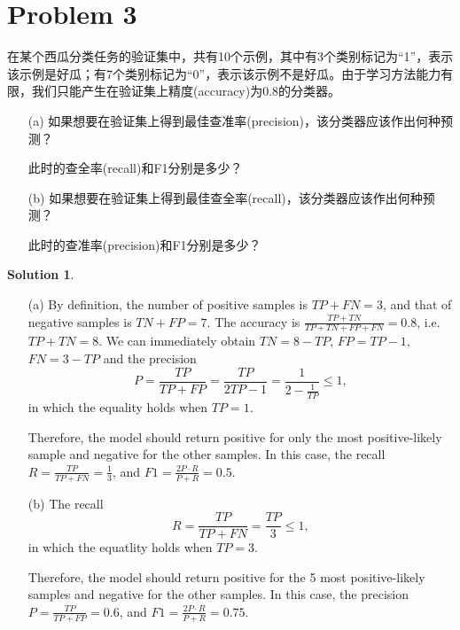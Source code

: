 \documentclass[a4paper,UTF8]{article}
\theoremstyle{definition}
\newtheorem*{solution}{Solution}
\begin{document}
\section*{Problem 3} 
在某个西瓜分类任务的验证集中，共有10个示例，其中有3个类别标记为“1”，表示该示例是好瓜；有7个类别标记为“0”，表示该示例不是好瓜。由于学习方法能力有限，我们只能产生在验证集上精度(accuracy)为0.8的分类器。
\begin{itemize}
\item[(a)] 如果想要在验证集上得到最佳查准率(precision)，该分类器应该作出何种预测？

此时的查全率(recall)和F1分别是多少？
\item[(b)] 如果想要在验证集上得到最佳查全率(recall)，该分类器应该作出何种预测？

此时的查准率(precision)和F1分别是多少？
\end{itemize}
\begin{solution}
\begin{itemize}
\item[(a)] By definition, the number of positive samples is $TP + FN=3$, and that of negative samples is $TN +FP=7$. The accuracy is $\frac{TP+TN}{TP+TN+FP+FN}=0.8$, i.e. $TP+TN=8$. We can immediately obtain $TN=8-TP$, $FP=TP-1$, $FN=3-TP$ and the precision
\begin{equation}
P=\frac{TP}{TP+FP}=\frac{TP}{2TP-1}=\frac{1}{2-\frac{1}{TP}}\leq 1,
\end{equation}
in which the equality holds when $TP=1$.

Therefore, the model should return positive for only the most positive-likely sample and negative for the other samples. In this case, the recall $R=\frac{TP}{TP+FN}=\frac{1}{3}$, and $F1=\frac{2P\cdot R}{P+R}=0.5$.

\item[(b)] The recall
\begin{equation}
R=\frac{TP}{TP+FN}=\frac{TP}{3}\leq 1,
\end{equation}
in which the equatlity holds when $TP=3$.

Therefore, the model should return positive for the 5 most positive-likely samples and negative for the other samples. In this case, the precision $P=\frac{TP}{TP+FP}=0.6$, and $F1=\frac{2P\cdot R}{P+R}=0.75$.

\end{itemize}
~\\
~\\
\end{solution}
\end{document}
